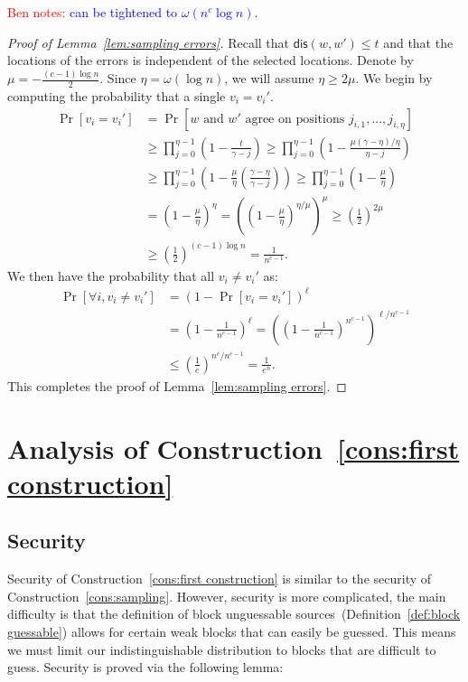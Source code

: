 \documentclass[11pt]{article}
\newcommand{\defref}[1]{\mbox{Definition~\ref{#1}}}
\newcommand{\lemref}[1]{\mbox{Lemma~\ref{#1}}}
\newcommand{\consref}[1]{\mbox{Construction~\ref{#1}}}
\newcommand{\dis}{\ensuremath{\mathsf{dis}}}
\newcommand{\authnote}[2]{{\textcolor{red}{\textsf{#1 notes: }\textcolor{blue}{ #2}}\marginpar{\textcolor{red}{\textbf{!!!!!}}}}}
\newcommand{\authnote}[2]{}
\newcommand{\bnote}[1]{{\authnote{Ben}{#1}}}
\begin{document}
\bnote{can be tightened to $\omega(n^c \log n)$.}
\begin{proof}[Proof of \lemref{lem:sampling errors}]

Recall that $\dis(w, w')\leq t$ and that the locations of the errors is independent of the selected locations.  Denote by $\mu = -\frac{(c-1)\log n}{2}$.  Since $\eta = \omega(\log n)$, we will assume
$\eta\ge 2\mu$.  We begin by computing the probability that a single $v_i = v_i'$.
\begin{align*}
\Pr[v_i = v_i'] &= \Pr[w\text{ and }w'\text{ agree on positions }j_{i,1},..., j_{i,\eta}]\\
&\ge \prod_{j=0}^{\eta-1} \left( 1- \frac{t}{\gamma -j }\right) \ge \prod_{j=0}^{\eta-1}\left(1-\frac{\mu(\gamma-\eta)/\eta}{\eta-j}\right)\\
&\ge \prod_{j=0}^{\eta-1} \left( 1- \frac{\mu}{\eta}\left(\frac{\gamma-\eta}{\gamma -j }\right)\right)\ge \prod_{j=0}^{\eta-1}\left(1-\frac{\mu}{\eta}\right)\\
&= \left(1-\frac{\mu}{\eta}\right)^{\eta} =\left( \left(1-\frac{\mu}{\eta}\right)^{\eta/\mu}\right)^\mu\geq \left(\frac{1}{2}\right)^{2\mu}\\
&\ge \left(\frac{1}{2}\right)^{(c-1) \log n}= \frac{1}{n^{c-1}}.
\end{align*}
We then have the probability that all $v_i\neq v_i'$ as:
\begin{align*}
\Pr[\forall i, v_i \neq v_i'] &= \left(1-\Pr[v_i= v_i']\right)^\ell\\
&=\left( 1- \frac{1}{n^{c-1}}\right)^\ell =\left(\left( 1- \frac{1}{n^{c-1}}\right)^{n^{c-1}}\right)^{\ell /n^{c-1}}\\
&\le \left(\frac{1}{e}\right)^{n^c/n^{c-1}} = \frac{1}{e^n}.
\end{align*}
This completes the proof of \lemref{lem:sampling errors}.
\end{proof}


\section{Analysis of \consref{cons:first construction}}
\label{sec:construction analysis}
\subsection{Security}
Security of \consref{cons:first construction} is similar to the security of \consref{cons:sampling}.  However, security is more complicated, the main difficulty is that the definition of block unguessable sources~(\defref{def:block guessable}) allows for certain weak blocks that can easily be guessed.  This means we must limit our indistinguishable distribution to blocks that are difficult to guess.  Security is proved via the following lemma:
\end{document}
